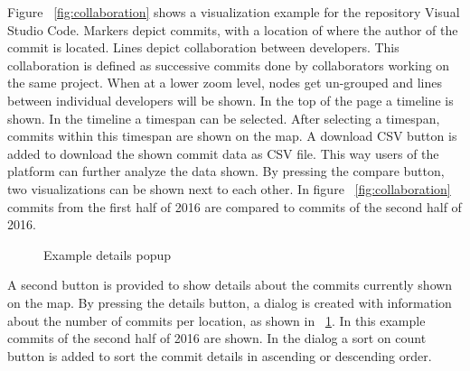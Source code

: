 \documentclass[acmtog, authorversion]{acmart}
\begin{document}
Figure ~\ref{fig:collaboration} shows a visualization example for the repository Visual Studio Code.
Markers depict commits, with a location of where the author of the commit is located.
Lines depict collaboration between developers.
This collaboration is defined as successive commits done by collaborators working on the same project.
When at a lower zoom level, nodes get un-grouped and lines between individual developers will be shown.
In the top of the page a timeline is shown.
In the timeline a timespan can be selected.
After selecting a timespan, commits within this timespan are shown on the map.
A download CSV button is added to download the shown commit data as CSV file.
This way users of the platform can further analyze the data shown.
By pressing the compare button, two visualizations can be shown next to each other.
In figure  ~\ref{fig:collaboration} commits from the first half of 2016 are compared to commits of the second half of 2016.
\begin{figure}
\center
{}
\caption{Example details popup}
\label{fig:details}
\end{figure}

A second button is provided to show details about the commits currently shown on the map.
By pressing the details button, a dialog is created with information about the number of commits per location, as shown in ~\ref{fig:details}.
In this example commits of the second half of 2016 are shown.
In the dialog a sort on count button is added to sort the commit details in ascending or descending order.
\end{document}
